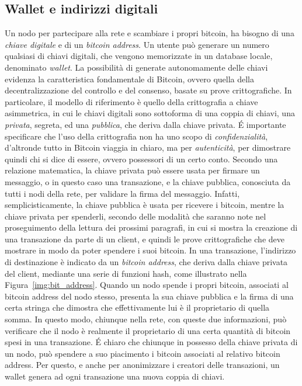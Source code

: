 \subsection{Wallet e indirizzi digitali}
Un nodo per partecipare alla rete e scambiare i propri bitcoin, ha bisogno di una \emph{chiave digitale} e di un \emph{bitcoin address}. Un utente può generare un numero qualsiasi di chiavi digitali, che vengono memorizzate in un database locale, denominato \emph{wallet}.
La possibilità di generate autonomamente delle chiavi evidenza la caratteristica fondamentale di Bitcoin, ovvero quella della decentralizzazione del controllo e del consenso, basate su prove crittografiche.
In particolare, il modello di riferimento è quello della crittografia a chiave asimmetrica, in cui le chiavi digitali sono sottoforma di una coppia di chiavi, una \emph{privata}, segreta, ed una \emph{pubblica}, che deriva dalla chiave privata. \'E importante specificare che l'uso della crittografia non ha uno scopo di \emph{confidenzialità}, d'altronde tutto in Bitcoin viaggia in chiaro, ma per \emph{autenticità}, per dimostrare quindi chi si dice di essere, ovvero possessori di un certo conto.
Secondo una relazione matematica, la chiave privata può essere usata per firmare un messaggio, o in questo caso una transazione,  e la chiave pubblica, conosciuta da tutti i nodi della rete, per validare la firma del messaggio. Infatti, semplicisticamente, la chiave pubblica è usata per ricevere i bitcoin, mentre la chiave privata per spenderli, secondo delle modalità che saranno note nel proseguimento della lettura dei prossimi paragrafi, in cui si mostra la creazione di una transazione da parte di un client, e quindi le prove crittografiche che deve mostrare in modo da poter spendere i suoi bitcoin.
In una transazione, l'indirizzo di destinazione è indicato da un \emph{bitcoin address}, che deriva dalla chiave privata del client, mediante una serie di funzioni hash, come illustrato nella Figura~\ref{img:bit_address}.
Quando un nodo spende i propri bitcoin, associati al bitcoin address del nodo stesso, presenta la sua chiave pubblica e la firma di una certa stringa che dimostra che effettivamente lui è il proprietario di quella somma. In questo modo, chiunque nella rete, con queste due informazioni, può verificare che il nodo è realmente il proprietario di una certa quantità di bitcoin spesi in una transazione. \'E chiaro che chiunque in possesso della chiave privata di un nodo, può spendere a suo piacimento i bitcoin associati al relativo bitcoin address. Per questo, e anche per anonimizzare i creatori delle transazioni, un wallet genera ad ogni transazione una nuova coppia di chiavi.

